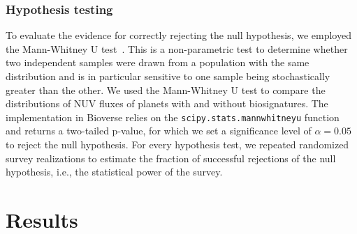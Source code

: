 \documentclass[twocolumn,twocolappendix,linenumbers]{aastex631}
\begin{document}

\subsubsection{Hypothesis testing}
To evaluate the evidence for correctly rejecting the null hypothesis, we employed the Mann-Whitney U test~\citep{Mann1947}.
This is a non-parametric test to determine whether two independent samples were drawn from a population with the same distribution and is in particular sensitive to one sample being stochastically greater than the other.
We used the Mann-Whitney U test to compare the distributions of \gls{NUV} fluxes of planets with and without biosignatures.
The implementation in Bioverse relies on the \texttt{scipy.stats.mannwhitneyu} function~\citep{Virtanen2020} and returns a two-tailed p-value, for which we set a significance level of $\alpha = 0.05$ to reject the null hypothesis.
For every hypothesis test, we repeated randomized survey realizations to estimate the fraction of successful rejections of the null hypothesis, i.e., the statistical power of the survey.


\section{Results}
\label{sec:results}

\end{document}
